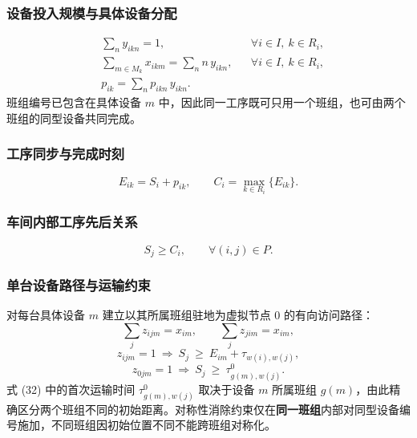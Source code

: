 \documentclass[12pt,a4paper]{article}
\begin{document}
\subsubsection{设备投入规模与具体设备分配}

\begin{align}
&\sum_{n} y_{ikn}=1, && \forall i\in I,\ k\in R_i,\\
&\sum_{m\in M_k} x_{ikm}=\sum_{n} n\,y_{ikn}, && \forall i\in I,\ k\in R_i,\\
&p_{ik}=\sum_{n} p_{ikn}\,y_{ikn}.
\end{align}
班组编号已包含在具体设备 $m$ 中，因此同一工序既可只用一个班组，也可由两个班组的同型设备共同完成。

\subsubsection{工序同步与完成时刻}

\begin{equation}
E_{ik}=S_i+p_{ik},\qquad C_i=\max_{k\in R_i}\{E_{ik}\}.
\end{equation}

\subsubsection{车间内部工序先后关系}

\begin{equation}
S_j\ge C_i,\qquad \forall (i,j)\in P .
\end{equation}

\subsubsection{单台设备路径与运输约束}

对每台具体设备 $m$ 建立以其所属班组驻地为虚拟节点 0 的有向访问路径：
\begin{equation}
\sum_j z_{ijm}=x_{im},\qquad \sum_j z_{jim}=x_{im},
\end{equation}
\begin{equation}
z_{ijm}=1\ \Rightarrow\ S_j\ \ge\ E_{im}+\tau_{w(i),w(j)},
\end{equation}
\begin{equation}
z_{0jm}=1\ \Rightarrow\ S_j\ \ge\ \tau^{0}_{g(m),w(j)} .
\end{equation}
式 (32) 中的首次运输时间 $\tau^{0}_{g(m),w(j)}$ 取决于设备 $m$ 所属班组 $g(m)$，由此精确区分两个班组不同的初始距离。对称性消除约束仅在\textbf{同一班组}内部对同型设备编号施加，不同班组因初始位置不同不能跨班组对称化。
\end{document}
